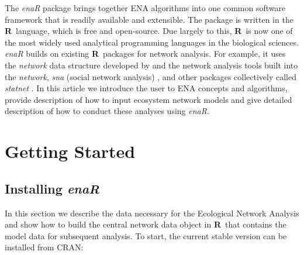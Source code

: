 \documentclass[article]{jss}
\newcommand{\R}{\textbf{R}}
\begin{document}
The \textit{enaR} package brings together ENA algorithms into one
common software framework that is readily available and extensible.
The package is written in the \R\ language, which is free and
open-source.  Due largely to this, \R\ is now one of the most widely
used analytical programming languages in the biological
sciences. \textit{enaR} builds on existing \R\ packages for
network analysis. For example, it uses the \textit{network} data
structure developed by \citet{butts08_network} and the network
analysis tools built into the \textit{network}, \textit{sna} (social
network analysis) \citep{butts08_social}, and other packages
collectively called \textit{statnet} \citep{handcock2008statnet}. In
this article we introduce the user to ENA concepts and algorithms,
provide description of how to input ecosystem network models and give
detailed description of how to conduct these analyses using
\textit{enaR}.









\section{Getting Started}

\subsection{Installing \textit{enaR}}
In this section we describe the data necessary for the Ecological
Network Analysis and show how to build the central network data object
in \R\ that contains the model data for subsequent analysis.  To
start, the current stable version can be installed from CRAN:
\end{document}
